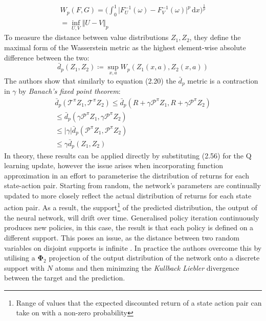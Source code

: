 \begin{equation}
    \begin{gathered}
        W_p(F,G) = \biggl ( \int_{0}^{1} \vert F^{-1}_U(\omega) - F^{-1}_{V}(\omega) \vert^p \,\mathrm{d}x \biggl )^{\frac{1}{p}} \\
        = \inf_{U,V} \Vert U - V \Vert_p
    \end{gathered}
\end{equation}
To measure the distance between value distributions $Z_1, Z_2$, they define the maximal form of the Wasserstein metric
as the highest element-wise absolute difference between the two:
\begin{equation}
    \bar{d}_p(Z_1, Z_2) \coloneqq \sup_{x,a} W_p(Z_1(x,a), Z_2(x,a)) 
\end{equation}
The authors show that similarly to equation (2.20) the $\bar{d}_p$ metric is a contraction in $\gamma$
by \emph{Banach's fixed point theorem}:
\begin{equation}
    \begin{gathered}
        \bar{d}_p( \mathcal{T}^\pi Z_1, \mathcal{T}^\pi Z_2) \leqslant \bar{d}_p(R + \gamma \mathcal{P}^\pi Z_1, R + \gamma \mathcal{P}^\pi Z_2) \\
        \leqslant \bar{d}_p(\gamma \mathcal{P}^\pi Z_1, \gamma \mathcal{P}^\pi Z_2) \\
        \leqslant \vert \gamma \vert \bar{d}_p(\mathcal{P}^\pi Z_1, \mathcal{P}^\pi Z_2) \\
        \leqslant \gamma \bar{d}_p(Z_1, Z_2) 
    \end{gathered}
\end{equation}
In theory, these results can be applied directly by substituting (2.56) for the Q learning update, however
the issue arises when incorporating function approximation in an effort to parameterise the distribution
of returns for each state-action pair. Starting from random, the network's parameters 
are continually updated to more closely reflect the actual distribution of returns for each state action pair.
As a result, the support\footnote{Range of values that the expected discounted return of a state action pair can take on with a non-zero probability}
of the predicted distribution, the output of the neural network, will drift over time. Generalised policy iteration
continuously produces new policies, in this case, the result is that each policy is defined on a different support.
This poses an issue, as the distance between two random variables on disjoint supports is infinite \cite{Bellemare2017}.
In practice the authors overcome this by utilising a $\mathbf{\Phi}_2$ projection of the output distribution of the network 
onto a discrete support with $N$ atoms and then minimzing the \emph{Kullback Liebler} divergence between the target and the prediction.\\

